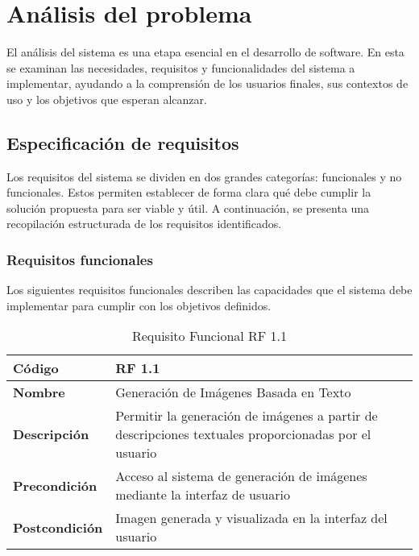 \section{Análisis del problema}
El análisis del sistema es una etapa esencial en el desarrollo de software. En esta se examinan las necesidades, requisitos y funcionalidades del sistema a implementar, ayudando a la comprensión de los usuarios finales, sus contextos de uso y los objetivos que esperan alcanzar.

\subsection{Especificación de requisitos}
Los requisitos del sistema se dividen en dos grandes categorías: funcionales y no funcionales. Estos permiten establecer de forma clara qué debe cumplir la solución propuesta para ser viable y útil. A continuación, se presenta una recopilación estructurada de los requisitos identificados.

\subsubsection{Requisitos funcionales}
Los siguientes requisitos funcionales describen las capacidades que el sistema debe implementar para cumplir con los objetivos definidos.

\begin{table}[H]
    \centering 
    \renewcommand{\arraystretch}{1.5} 
    \begin{tabular}{|l|p{12cm}|} 
        \hline 
        \rowcolor{gray!30} 
        \textbf{Código} & \textbf{RF 1.1} \\
        \hline
        \textbf{Nombre} & Generación de Imágenes Basada en Texto \\
        \hline 
        \textbf{Descripción} & Permitir la generación de imágenes a partir de descripciones textuales proporcionadas por el usuario \\
        \hline 
        \textbf{Precondición} & Acceso al sistema de generación de imágenes mediante la interfaz de usuario \\
        \hline 
        \textbf{Postcondición} & Imagen generada y visualizada en la interfaz del usuario \\
        \hline 
    \end{tabular}
    \caption{Requisito Funcional RF 1.1} 
    \label{tab:reqfun1}
\end{table}

